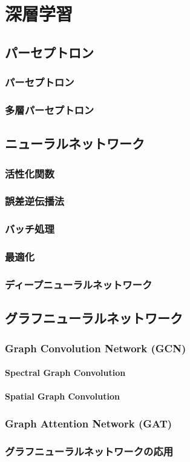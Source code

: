 
\chapter{深層学習} \label{sec:Deeplearning}
\section{パーセプトロン}
\subsection{パーセプトロン}
\subsection{多層パーセプトロン}

\section{ニューラルネットワーク}
\subsection{活性化関数}
\subsection{誤差逆伝播法}
\subsection{バッチ処理}
\subsection{最適化}
\subsection{ディープニューラルネットワーク}

\section{グラフニューラルネットワーク}
\subsection{Graph Convolution Network (GCN)}
\subsubsection{Spectral Graph Convolution}
\subsubsection{Spatial Graph Convolution}
\subsection{Graph Attention Network (GAT)}
\subsection{グラフニューラルネットワークの応用}
